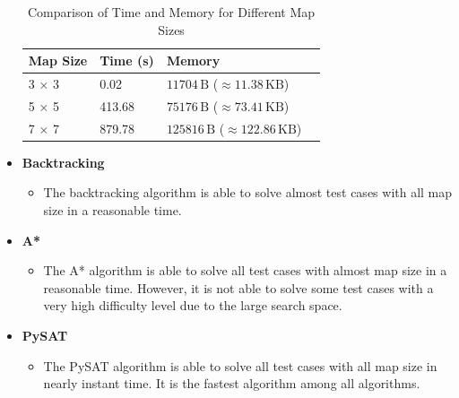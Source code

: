 \begin{flushleft}
\begin{itemize}
\begin{flushleft}
                  \begin{table}[ht]
                      \centering
                      \begin{tabular}{|l|l|l|l|}
                          \hline
                          \textbf{Map Size} & \textbf{Time (s)} & \textbf{Memory}                                         \\
                          \hline
                          3 × 3             & 0.02              & \( 11704 \, \text{B} \) (\( \approx 11.38 \, \text{KB} \))   \\
                          \hline
                          5 × 5             & 413.68            & \( 75176 \, \text{B} \) (\( \approx 73.41 \, \text{KB} \))   \\
                          \hline
                          7 × 7             & 879.78            & \( 125816 \, \text{B} \) (\( \approx 122.86 \, \text{KB} \)) \\
                          \hline
                      \end{tabular}
                      \caption{Comparison of Time and Memory for Different Map Sizes}
                  \end{table}
              \end{flushleft}
        \item \textbf{Backtracking}
              \begin{itemize}
                  \item The backtracking algorithm is able to solve almost test cases with all map size in a reasonable time.
              \end{itemize}
        \item \textbf{A*}
              \begin{itemize}
                  \item The A* algorithm is able to solve all test cases with almost map size in a reasonable time. However, it is not able to solve some test cases with a very high difficulty level due to the large search space.
              \end{itemize}
        \item \textbf{PySAT}
              \begin{itemize}
                  \item The PySAT algorithm is able to solve all test cases with all map size in nearly instant time. It is the fastest algorithm among all algorithms.
              \end{itemize}
    \end{itemize}
\end{flushleft}

